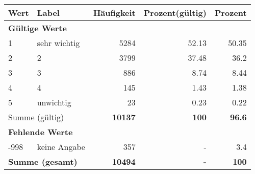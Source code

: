      \begin{longtable}{lXrrr}
     \toprule
     \textbf{Wert} & \textbf{Label} & \textbf{Häufigkeit} & \textbf{Prozent(gültig)} & \textbf{Prozent} \\
     \endhead
     \midrule
     \multicolumn{5}{l}{\textbf{Gültige Werte}}\\

     1 &
     \multicolumn{1}{X}{ sehr wichtig   } &


       \num{5284} &
       \num[round-mode=places,round-precision=2]{52,13} &
         \num[round-mode=places,round-precision=2]{50,35} \\

     2 &
     \multicolumn{1}{X}{ 2   } &


       \num{3799} &
       \num[round-mode=places,round-precision=2]{37,48} &
         \num[round-mode=places,round-precision=2]{36,2} \\

     3 &
     \multicolumn{1}{X}{ 3   } &


       \num{886} &
       \num[round-mode=places,round-precision=2]{8,74} &
         \num[round-mode=places,round-precision=2]{8,44} \\

     4 &
     \multicolumn{1}{X}{ 4   } &


       \num{145} &
       \num[round-mode=places,round-precision=2]{1,43} &
         \num[round-mode=places,round-precision=2]{1,38} \\

     5 &
     \multicolumn{1}{X}{ unwichtig   } &


       \num{23} &
       \num[round-mode=places,round-precision=2]{0,23} &
         \num[round-mode=places,round-precision=2]{0,22} \\
     \midrule
     \multicolumn{2}{l}{Summe (gültig)} &
       \textbf{\num{10137}} &
     \textbf{100} &
       \textbf{\num[round-mode=places,round-precision=2]{96,6}} \\
     \multicolumn{5}{l}{\textbf{Fehlende Werte}}\\
       -998 &
       keine Angabe &
         \num{357} &
        - &
         \num[round-mode=places,round-precision=2]{3,4} \\
     \midrule
     \multicolumn{2}{l}{\textbf{Summe (gesamt)}} &
          \textbf{\num{10494}} &
        \textbf{-} &
        \textbf{100} \\
     \bottomrule
     \end{longtable}
     
